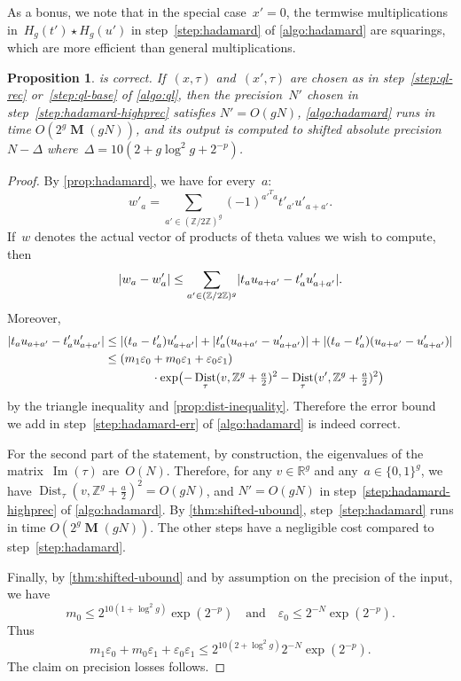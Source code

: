 \documentclass[12pt,oneside]{amsart}
\numberwithin{equation}{section}
\newtheorem{prop}[equation]{Proposition}
\theoremstyle{definition}
\newcommand{\Z}{\mathbb{Z}}
\newcommand{\R}{\mathbb{R}}
\newcommand{\eps}{\varepsilon}
\DeclareMathOperator{\im}{Im}
\DeclareMathOperator{\Dist}{Dist}
\DeclareMathOperator{\Mul}{\mathbf{M}}
\DeclarePairedDelimiter{\abs}{|}{|}
\DeclarePairedDelimiter{\paren}{(}{)}
\begin{document}
As a bonus, we note that in the special case~$x'=0$, the termwise
multiplications in~$H_g(t')\star H_g(u')$ in step~\eqref{step:hadamard} of
\cref{algo:hadamard} are squarings, which are more efficient than general
multiplications.

\begin{prop}
  \label{prop:algo-hadamard}
   is correct. If~$(x,\tau)$ and~$(x',\tau)$ are
  chosen as in step~\eqref{step:ql-rec} or~\eqref{step:ql-base} of
  \cref{algo:ql}, then the precision~$N'$ chosen in
  step~\eqref{step:hadamard-highprec} satisfies $N' = O(gN)$,
  \cref{algo:hadamard} runs in time $O(2^g \Mul(gN))$, and its output is computed to
  shifted absolute precision~$N-\Delta$ where~$\Delta= 10(2+g\log^2 g + 2^{-p})$.
\end{prop}

\begin{proof}
  By \cref{prop:hadamard}, we have for every~$a$:
  \begin{displaymath}
    w'_a = \sum_{a'\in (\Z/2\Z)^g} (-1)^{a'^T a} t'_{a'} u'_{a+a'}.
  \end{displaymath}
  If~$w$ denotes the actual vector of products of theta values we wish to
  compute, then
  \begin{displaymath}
    \abs{w_a - w'_a} \leq \sum_{a'\in (\Z/2\Z)^g} \abs{t_a u_{a+a'} - t'_a u'_{a+a'}}.
  \end{displaymath}
  Moreover,
  \begin{align*}
    \abs{t_a u_{a+a'} - t'_a u'_{a+a'}}
    &\leq \abs{(t_a - t'_a)u'_{a+a'}} + \abs{t'_a(u_{a+a'} - u'_{a+a'})} + \abs{(t_a - t'_a)(u_{a+a'} - u'_{a+a'})}\\
    &\leq (m_1 \eps_0 + m_0 \eps_1 + \eps_0\eps_1)\\
      &\qquad\qquad\cdot\exp\paren[\big]{- \Dist_\tau(v, \Z^g + \tfrac a2)^2 - \Dist_\tau(v', \Z^g + \tfrac a2)^2}
  \end{align*}
  by the triangle inequality and \cref{prop:dist-inequality}. Therefore the
  error bound we add in step~\eqref{step:hadamard-err} of \cref{algo:hadamard}
  is indeed correct.

  For the second part of the statement, by construction, the eigenvalues of the
  matrix~$\im(\tau)$ are~$O(N)$. Therefore, for any $v\in \R^g$ and
  any~$a\in \{0,1\}^g$, we have $\Dist_{\tau}(v,\Z^g + \tfrac a2)^2 = O(gN)$,
  and $N' = O(gN)$ in step~\eqref{step:hadamard-highprec} of
  \cref{algo:hadamard}.  By \cref{thm:shifted-ubound},
  step~\eqref{step:hadamard} runs in time $O(2^g \Mul(gN))$. The other steps
  have a negligible cost compared to step~\eqref{step:hadamard}.

  Finally, by \cref{thm:shifted-ubound} and by assumption on the precision of
  the input, we have
  \begin{displaymath}
    m_0 \leq 2^{10(1+\log^2 g)} \exp(2^{-p}) \quad \text{and}\quad \eps_0\leq 2^{-N} \exp(2^{-p}).
  \end{displaymath}
  Thus
  \begin{displaymath}
    m_1\eps_0 + m_0\eps_1 + \eps_0\eps_1 \leq 2^{10(2 + \log^2 g)} 2^{-N} \exp(2^{-p}).
  \end{displaymath}
  The claim on precision losses follows.
\end{proof}
\end{document}
